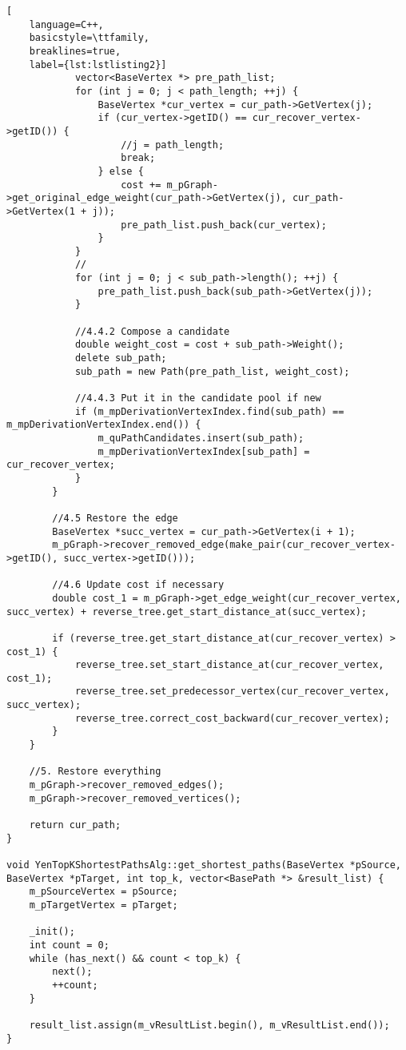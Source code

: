 \begin{lstlisting}[
    language=C++,
    basicstyle=\ttfamily,
    breaklines=true,
    label={lst:lstlisting2}]
            vector<BaseVertex *> pre_path_list;
            for (int j = 0; j < path_length; ++j) {
                BaseVertex *cur_vertex = cur_path->GetVertex(j);
                if (cur_vertex->getID() == cur_recover_vertex->getID()) {
                    //j = path_length;
                    break;
                } else {
                    cost += m_pGraph->get_original_edge_weight(cur_path->GetVertex(j), cur_path->GetVertex(1 + j));
                    pre_path_list.push_back(cur_vertex);
                }
            }
            //
            for (int j = 0; j < sub_path->length(); ++j) {
                pre_path_list.push_back(sub_path->GetVertex(j));
            }

            //4.4.2 Compose a candidate
            double weight_cost = cost + sub_path->Weight();
            delete sub_path;
            sub_path = new Path(pre_path_list, weight_cost);

            //4.4.3 Put it in the candidate pool if new
            if (m_mpDerivationVertexIndex.find(sub_path) == m_mpDerivationVertexIndex.end()) {
                m_quPathCandidates.insert(sub_path);
                m_mpDerivationVertexIndex[sub_path] = cur_recover_vertex;
            }
        }

        //4.5 Restore the edge
        BaseVertex *succ_vertex = cur_path->GetVertex(i + 1);
        m_pGraph->recover_removed_edge(make_pair(cur_recover_vertex->getID(), succ_vertex->getID()));

        //4.6 Update cost if necessary
        double cost_1 = m_pGraph->get_edge_weight(cur_recover_vertex, succ_vertex) + reverse_tree.get_start_distance_at(succ_vertex);

        if (reverse_tree.get_start_distance_at(cur_recover_vertex) > cost_1) {
            reverse_tree.set_start_distance_at(cur_recover_vertex, cost_1);
            reverse_tree.set_predecessor_vertex(cur_recover_vertex, succ_vertex);
            reverse_tree.correct_cost_backward(cur_recover_vertex);
        }
    }

    //5. Restore everything
    m_pGraph->recover_removed_edges();
    m_pGraph->recover_removed_vertices();

    return cur_path;
}

void YenTopKShortestPathsAlg::get_shortest_paths(BaseVertex *pSource, BaseVertex *pTarget, int top_k, vector<BasePath *> &result_list) {
    m_pSourceVertex = pSource;
    m_pTargetVertex = pTarget;

    _init();
    int count = 0;
    while (has_next() && count < top_k) {
        next();
        ++count;
    }

    result_list.assign(m_vResultList.begin(), m_vResultList.end());
}
\end{lstlisting}


